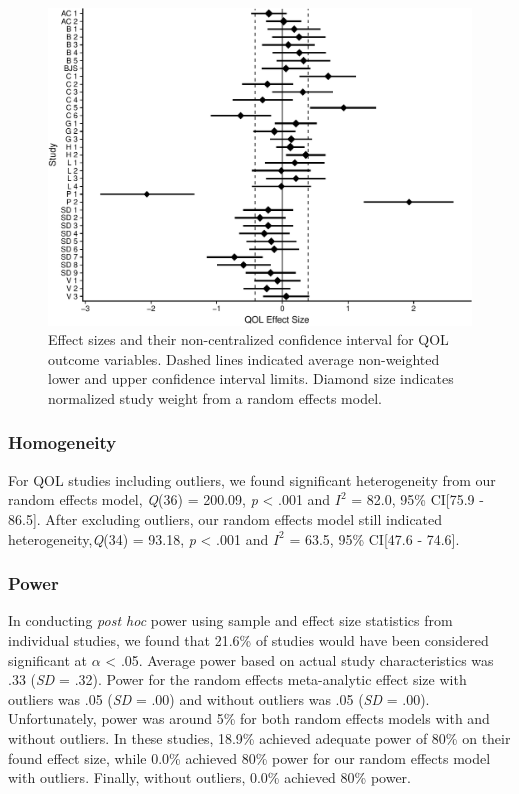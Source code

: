 \documentclass[english,man]{apa6}
\theoremstyle{definition}
\theoremstyle{definition}
\theoremstyle{definition}
\theoremstyle{remark}
\begin{document}
\begin{figure}
\centering
\includegraphics{meta_markdown_files/figure-latex/qolpic-1.pdf}
\caption{\label{fig:qolpic}Effect sizes and their non-centralized confidence
interval for QOL outcome variables. Dashed lines indicated average
non-weighted lower and upper confidence interval limits. Diamond size
indicates normalized study weight from a random effects model.}
\end{figure}

\subsubsection{Homogeneity}\label{homogeneity-2}

For QOL studies including outliers, we found significant heterogeneity
from our random effects model, \emph{Q}(36) = 200.09, \emph{p}
\textless{} .001 and \(I^2\) = 82.0, 95\% CI{[}75.9 - 86.5{]}. After
excluding outliers, our random effects model still indicated
heterogeneity,\emph{Q}(34) = 93.18, \emph{p} \textless{} .001 and
\(I^2\) = 63.5, 95\% CI{[}47.6 - 74.6{]}.

\subsubsection{Power}\label{power-2}

In conducting \emph{post hoc} power using sample and effect size
statistics from individual studies, we found that 21.6\% of studies
would have been considered significant at \(\alpha\) \textless{} .05.
Average power based on actual study characteristics was .33 (\emph{SD} =
.32). Power for the random effects meta-analytic effect size with
outliers was .05 (\emph{SD} = .00) and without outliers was .05
(\emph{SD} = .00). Unfortunately, power was around 5\% for both random
effects models with and without outliers. In these studies, 18.9\%
achieved adequate power of 80\% on their found effect size, while 0.0\%
achieved 80\% power for our random effects model with outliers. Finally,
without outliers, 0.0\% achieved 80\% power.
\end{document}
